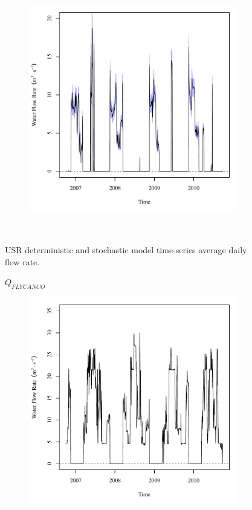 \begin{linenumbers}
\begin{landscape}
\begin{figure}
\begin{subfigure}{0.7\textwidth}
			\includegraphics[width=\tableCustomSize]{"Figures/Results_USR/Stochastic/Q FLS"}
		\end{subfigure}\\
		\caption{USR deterministic and stochastic model time-series average daily flow rate.}
	\end{figure}
\end{landscape}
\subfiguremid
\begin{landscape}
	\begin{figure}
		\centering
		$ Q_{FLYCANCO} $
		\begin{subfigure}{0.7\textwidth}
			\centering
			\includegraphics[width=\tableCustomSize]{"Figures/Results_USR/Deterministic/Q FLY"}

\end{subfigure}
\end{figure}
\end{landscape}
\end{linenumbers}
